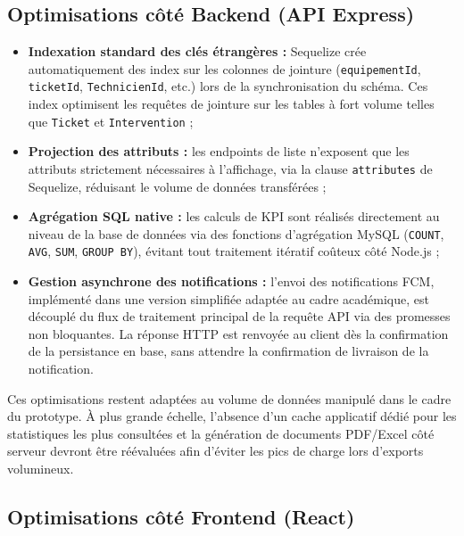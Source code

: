 \subsection*{Optimisations côté Backend (API Express)}

\begin{itemize}
    \item \textbf{Indexation standard des clés étrangères :} Sequelize crée automatiquement des index sur les colonnes de jointure (\texttt{equipementId}, \texttt{ticketId}, \texttt{TechnicienId}, etc.) lors de la synchronisation du schéma. Ces index optimisent les requêtes de jointure sur les tables à fort volume telles que \texttt{Ticket} et \texttt{Intervention} ;

    \item \textbf{Projection des attributs :} les endpoints de liste n'exposent que les attributs strictement nécessaires à l'affichage, via la clause \texttt{attributes} de Sequelize, réduisant le volume de données transférées ;

    \item \textbf{Agrégation SQL native :} les calculs de KPI sont réalisés directement au niveau de la base de données via des fonctions d'agrégation MySQL (\texttt{COUNT}, \texttt{AVG}, \texttt{SUM}, \texttt{GROUP BY}), évitant tout traitement itératif coûteux côté Node.js ;

    \item \textbf{Gestion asynchrone des notifications :} l'envoi des notifications FCM, implémenté dans une version simplifiée adaptée au cadre académique, est découplé du flux de traitement principal de la requête API via des promesses non bloquantes. La réponse HTTP est renvoyée au client dès la confirmation de la persistance en base, sans attendre la confirmation de livraison de la notification.
\end{itemize}

Ces optimisations restent adaptées au volume de données manipulé dans le cadre du prototype. À plus grande échelle, l'absence d'un cache applicatif dédié pour les statistiques les plus consultées et la génération de documents PDF/Excel côté serveur devront être réévaluées afin d'éviter les pics de charge lors d'exports volumineux.

\subsection*{Optimisations côté Frontend (React)}

